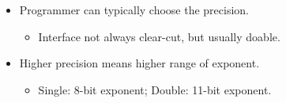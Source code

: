 \begin{frame}
\begin{itemize}
\begin{itemize}
\end{itemize}

\item<3-> Programmer can typically choose the precision.

\begin{itemize}

\item Interface not always clear-cut, but usually doable.

\end{itemize}

\item<4-> Higher precision means higher range of exponent.

\begin{itemize}

\item Single: 8-bit exponent; Double: 11-bit exponent.

\end{itemize}

\end{itemize}

\vspace{\fill}

\end{frame}
